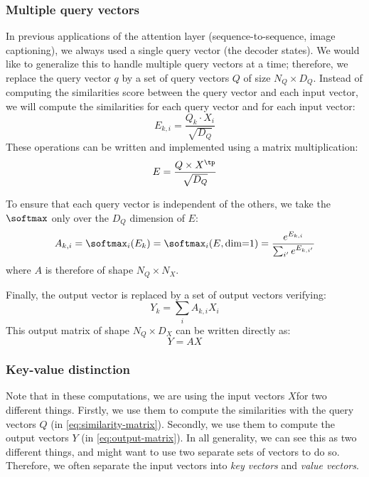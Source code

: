 \subsubsection{Multiple query vectors}
In previous applications of the attention layer (sequence-to-sequence, image captioning), we always used a single query vector (the decoder states). We would like to generalize this to handle multiple query vectors at a time; therefore, we replace the query vector $q$ by a set of query vectors $Q$ of size $N_Q\times D_Q$. Instead of computing the similarities score between the query vector and each input vector, we will compute the similarities for each query vector and for each input vector:
\begin{equation*}
    E_{k,i} = \frac{Q_k\cdot X_i}{\sqrt{D_Q}}
\end{equation*}
These operations can be written and implemented using a matrix multiplication:
\begin{equation}
    E = \frac{Q\times X^\tp}{\sqrt{D_Q}}
    \label{eq:similarity-matrix}
\end{equation}

To ensure that each query vector is independent of the others, we take the $\softmax$ only over the $D_Q$ dimension of $E$:
\begin{equation*}
    A_{k,i} = \softmax_i(E_k) = \softmax_i(E, \textnormal{dim=1}) = \frac{e^{E_{k,i}}}{\sum_{i'}e^{E_{k,i'}}}
\end{equation*}
where $A$ is therefore of shape $N_Q\times N_X$.

Finally, the output vector is replaced by a set of output vectors verifying:
\begin{equation*}
    Y_k = \sum_i A_{k,i}X_i
\end{equation*}
This output matrix of shape $N_Q\times D_X$ can be written directly as:
\begin{equation}
    Y = AX 
    \label{eq:output-matrix}
\end{equation}

\subsubsection{Key-value distinction}
Note that in these computations, we are using the input vectors $X$for two different things. Firstly, we use them to compute the similarities with the query vectors $Q$ (in \autoref{eq:similarity-matrix}). Secondly, we use them to compute the output vectors $Y$ (in \autoref{eq:output-matrix}). In all generality, we can see this as two different things, and might want to use two separate sets of vectors to do so. Therefore, we often separate the input vectors into \emph{key vectors} and \emph{value vectors}.

